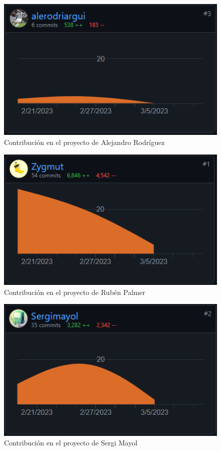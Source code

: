 \documentclass[12pt,journal,compsoc]{IEEEtran}
\begin{document}
\begin{figure}[!h]
    \centering
    \includegraphics[width=\linewidth]{alex.png}
    \caption{Contribución en el proyecto de Alejandro Rodríguez}
    \label{fig:contrib_alex}
\end{figure}

\begin{figure}[!h]
    \centering
    \includegraphics[width=\linewidth]{ruben.png}
    \caption{Contribución en el proyecto de Rubén Palmer}
    \label{fig:contrib_ruben}
\end{figure}

\begin{figure}[!h]
    \centering
    \includegraphics[width=\linewidth]{sergi.png}
    \caption{Contribución en el proyecto de Sergi Mayol}
    \label{fig:contrib_sergi}
\end{figure}
\end{document}
